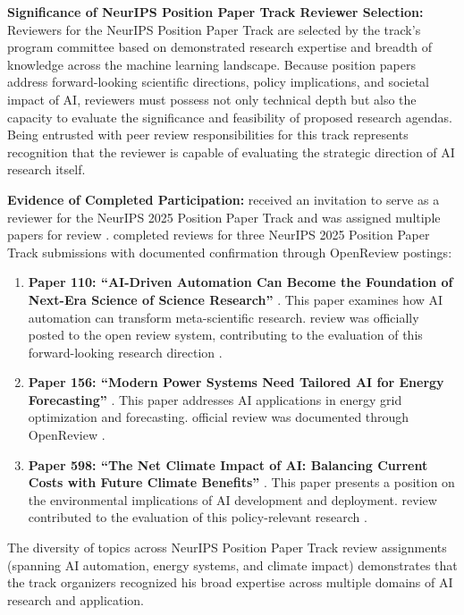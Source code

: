 \textbf{Significance of NeurIPS Position Paper Track Reviewer Selection:} Reviewers for the NeurIPS Position Paper Track are selected by the track's program committee based on demonstrated research expertise and breadth of knowledge across the machine learning landscape. Because position papers address forward-looking scientific directions, policy implications, and societal impact of AI, reviewers must possess not only technical depth but also the capacity to evaluate the significance and feasibility of proposed research agendas. Being entrusted with peer review responsibilities for this track represents recognition that the reviewer is capable of evaluating the strategic direction of AI research itself.

\textbf{Evidence of Completed Participation:} \dr received an invitation to serve as a reviewer for the NeurIPS 2025 Position Paper Track \cite{JR4} and was assigned multiple papers for review \cite{JR5}. \dr completed reviews for three NeurIPS 2025 Position Paper Track submissions with documented confirmation through OpenReview postings:

\begin{enumerate}
    \item \textbf{Paper 110: ``AI-Driven Automation Can Become the Foundation of Next-Era Science of Science Research''} \cite{JR22}. This paper examines how AI automation can transform meta-scientific research. \drs review was officially posted to the open review system, contributing to the evaluation of this forward-looking research direction \cite{JR23}.
    
    \item \textbf{Paper 156: ``Modern Power Systems Need Tailored AI for Energy Forecasting''} \cite{JR24}. This paper addresses AI applications in energy grid optimization and forecasting. \drs official review was documented through OpenReview \cite{JR25}.
    
    \item \textbf{Paper 598: ``The Net Climate Impact of AI: Balancing Current Costs with Future Climate Benefits''} \cite{JR26}. This paper presents a position on the environmental implications of AI development and deployment. \drs review contributed to the evaluation of this policy-relevant research \cite{JR27}.
\end{enumerate}

The diversity of topics across \drs NeurIPS Position Paper Track review assignments (spanning AI automation, energy systems, and climate impact) demonstrates that the track organizers recognized his broad expertise across multiple domains of AI research and application.

